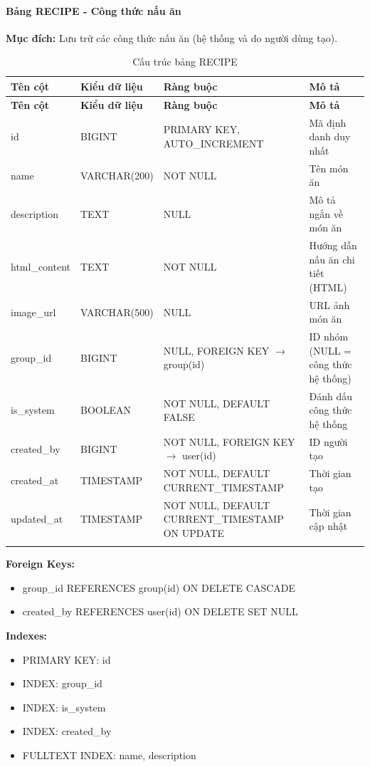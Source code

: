 \paragraph{Bảng RECIPE - Công thức nấu ăn}
\textbf{Mục đích:} Lưu trữ các công thức nấu ăn (hệ thống và do người dùng tạo).

\small
\begin{longtable}{|>{\raggedright\arraybackslash}p{3.5cm}|>{\raggedright\arraybackslash}p{3cm}|>{\raggedright\arraybackslash}p{4cm}|>{\raggedright\arraybackslash}p{4cm}|}
\hline
\textbf{Tên cột} & \textbf{Kiểu dữ liệu} & \textbf{Ràng buộc} & \textbf{Mô tả} \\
\hline
\endfirsthead
\hline
\textbf{Tên cột} & \textbf{Kiểu dữ liệu} & \textbf{Ràng buộc} & \textbf{Mô tả} \\
\hline
\endhead
id & BIGINT & PRIMARY KEY, AUTO\_INCREMENT & Mã định danh duy nhất \\
\hline
name & VARCHAR(200) & NOT NULL & Tên món ăn \\
\hline
description & TEXT & NULL & Mô tả ngắn về món ăn \\
\hline
html\_content & TEXT & NOT NULL & Hướng dẫn nấu ăn chi tiết (HTML) \\
\hline
image\_url & VARCHAR(500) & NULL & URL ảnh món ăn \\
\hline
group\_id & BIGINT & NULL, FOREIGN KEY $\rightarrow$ group(id) & ID nhóm (NULL = công thức hệ thống) \\
\hline
is\_system & BOOLEAN & NOT NULL, DEFAULT FALSE & Đánh dấu công thức hệ thống \\
\hline
created\_by & BIGINT & NOT NULL, FOREIGN KEY $\rightarrow$ user(id) & ID người tạo \\
\hline
created\_at & TIMESTAMP & NOT NULL, DEFAULT CURRENT\_TIMESTAMP & Thời gian tạo \\
\hline
updated\_at & TIMESTAMP & NOT NULL, DEFAULT CURRENT\_TIMESTAMP ON UPDATE & Thời gian cập nhật \\
\hline
\caption{Cấu trúc bảng RECIPE}
\end{longtable}

\textbf{Foreign Keys:}
\begin{itemize}
    \item group\_id REFERENCES group(id) ON DELETE CASCADE
    \item created\_by REFERENCES user(id) ON DELETE SET NULL
\end{itemize}

\textbf{Indexes:}
\begin{itemize}
    \item PRIMARY KEY: id
    \item INDEX: group\_id
    \item INDEX: is\_system
    \item INDEX: created\_by
    \item FULLTEXT INDEX: name, description
\end{itemize}

